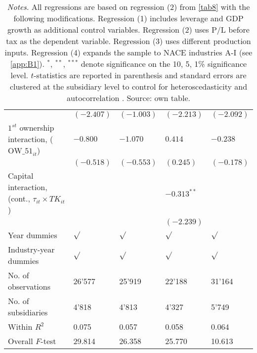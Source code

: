 \documentclass[10pt,twocolumn,oneside,cmyk]{article}
\begin{document}
\begin{table*}[t]
\begin{center}
\begin{tabularx}{0.85\textwidth}{l *{4}{Y}}
     &$(-2.407)$ &$(-1.003)$ &$(-2.213)$ &$(-2.092)$\\
     $1^{st}$ ownership interaction, ($\text{OW\_51}_{it}$) &$-0.800$ &$-1.070$ &$0.414$ &$-0.238$\\
     &$(-0.518)$ &$(-0.553)$ &$(0.245)$ &$(-0.178)$\\
     Capital interaction, (cont., $\tau_{it}\times TK_{it}$) & & &$-0.313^{**}$\\
     & & &$(-2.239)$\\
     Year dummies &$\sqrt{}$ &$\sqrt{}$ &$\sqrt{}$ &$\sqrt{}$\\
     Industry-year dummies &$\sqrt{}$ &$\sqrt{}$ &$\sqrt{}$ &$\sqrt{}$ \\
     No. of observations &26'577 &25'919 &22'188 &31'164\\
     No. of subsidiaries &4'818 &4'813 &4'327 &5'749\\
     Within $R^2$ &0.075 &0.057 &0.058 &0.064\\
     Overall $F$-test &29.814 &26.358 &25.770 &10.613\\
    \bottomrule
   \end{tabularx}
  \caption*{\footnotesize{\textit{Notes}. All regressions are based on regression (2) from \cref{tab8} with the following modifications. Regression (1) includes leverage and GDP growth as additional control variables. Regression (2) uses P/L before tax as the dependent variable. Regression (3) uses different production inputs. Regression (4) expands the sample to NACE industries A-I (see \cref{app:B1}). $^*$, $^{**}$, $^{***}$ denote significance on the 10, 5, 1\% significance level. $t$-statistics are reported in parenthesis and standard errors are clustered at the subsidiary level to control for heteroscedasticity and autocorrelation \parencite[285]{hoechle_robust_2007}. Source: own table.}}
 \end{center}
\end{table*}
\end{document}

